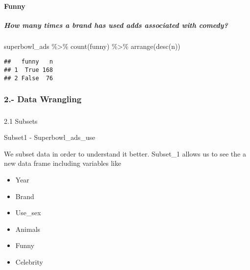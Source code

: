 \documentclass[
]{article}
\newenvironment{Shaded}{\begin{snugshade}}{\end{snugshade}}
\newcommand{\FunctionTok}[1]{\textcolor[rgb]{0.00,0.00,0.00}{#1}}
\newcommand{\NormalTok}[1]{#1}
\newcommand{\SpecialCharTok}[1]{\textcolor[rgb]{0.00,0.00,0.00}{#1}}
\providecommand{\tightlist}{%
  \setlength{\itemsep}{0pt}\setlength{\parskip}{0pt}}
\begin{document}
\hypertarget{funny}{%
\paragraph{Funny}\label{funny}}

\hypertarget{how-many-times-a-brand-has-used-adds-associated-with-comedy}{%
\subparagraph{How many times a brand has used adds associated with
comedy?}\label{how-many-times-a-brand-has-used-adds-associated-with-comedy}}

\begin{Shaded}
\begin{Highlighting}[]
\NormalTok{superbowl\_ads }\SpecialCharTok{\%\textgreater{}\%}
  \FunctionTok{count}\NormalTok{(funny) }\SpecialCharTok{\%\textgreater{}\%}
  \FunctionTok{arrange}\NormalTok{(}\FunctionTok{desc}\NormalTok{(n))}
\end{Highlighting}
\end{Shaded}

\begin{verbatim}
##   funny   n
## 1  True 168
## 2 False  76
\end{verbatim}

\hypertarget{section-1}{%
\paragraph*{}\label{section-1}}

\hypertarget{data-wrangling}{%
\subsubsection{2.- Data Wrangling}\label{data-wrangling}}

\hypertarget{section-2}{%
\subparagraph{}\label{section-2}}

2.1 Subsets

Subset1 - Superbowl\_ads\_use

We subset data in order to understand it better. Subset\_1 allows us to
see the a new data frame including variables like

\begin{itemize}
\tightlist
\item
  Year
\item
  Brand
\item
  Use\_sex
\item
  Animals
\item
  Funny
\item
  Celebrity
\end{itemize}
\end{document}
